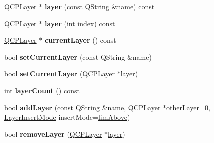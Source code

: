 \begin{DoxyCompactItemize}
\item 
\hyperlink{class_q_c_p_layer}{Q\+C\+P\+Layer} $\ast$ {\bfseries layer} (const Q\+String \&name) const \hypertarget{class_q_custom_plot_a9c760438b60791d601374477beba5534}{}\label{class_q_custom_plot_a9c760438b60791d601374477beba5534}

\item 
\hyperlink{class_q_c_p_layer}{Q\+C\+P\+Layer} $\ast$ {\bfseries layer} (int index) const \hypertarget{class_q_custom_plot_a655094d9553fb31e5220e87df46da736}{}\label{class_q_custom_plot_a655094d9553fb31e5220e87df46da736}

\item 
\hyperlink{class_q_c_p_layer}{Q\+C\+P\+Layer} $\ast$ {\bfseries current\+Layer} () const \hypertarget{class_q_custom_plot_a5ff39b8d1097115a317885567c76d95d}{}\label{class_q_custom_plot_a5ff39b8d1097115a317885567c76d95d}

\item 
bool {\bfseries set\+Current\+Layer} (const Q\+String \&name)\hypertarget{class_q_custom_plot_a73a6dc47c653bb6f8f030abca5a11852}{}\label{class_q_custom_plot_a73a6dc47c653bb6f8f030abca5a11852}

\item 
bool {\bfseries set\+Current\+Layer} (\hyperlink{class_q_c_p_layer}{Q\+C\+P\+Layer} $\ast$\hyperlink{class_q_custom_plot_aac492da01782820454e9136a8db28182}{layer})\hypertarget{class_q_custom_plot_a23a4d3cadad1a0063c5fe19aac5659e6}{}\label{class_q_custom_plot_a23a4d3cadad1a0063c5fe19aac5659e6}

\item 
int {\bfseries layer\+Count} () const \hypertarget{class_q_custom_plot_a1b3926884f5bd4bdda1495d8b3c891d0}{}\label{class_q_custom_plot_a1b3926884f5bd4bdda1495d8b3c891d0}

\item 
bool {\bfseries add\+Layer} (const Q\+String \&name, \hyperlink{class_q_c_p_layer}{Q\+C\+P\+Layer} $\ast$other\+Layer=0, \hyperlink{class_q_custom_plot_a75a8afbe6ef333b1f3d47abb25b9add7}{Layer\+Insert\+Mode} insert\+Mode=\hyperlink{class_q_custom_plot_a75a8afbe6ef333b1f3d47abb25b9add7a56ffb40bbf81e9b5d869cffc88999a36}{lim\+Above})\hypertarget{class_q_custom_plot_ad5255393df078448bb6ac83fa5db5f52}{}\label{class_q_custom_plot_ad5255393df078448bb6ac83fa5db5f52}

\item 
bool {\bfseries remove\+Layer} (\hyperlink{class_q_c_p_layer}{Q\+C\+P\+Layer} $\ast$\hyperlink{class_q_custom_plot_aac492da01782820454e9136a8db28182}{layer})\hypertarget{class_q_custom_plot_a40f75e342c5eaab6a86066a42a0e2a94}{}\label{class_q_custom_plot_a40f75e342c5eaab6a86066a42a0e2a94}


\end{DoxyCompactItemize}
